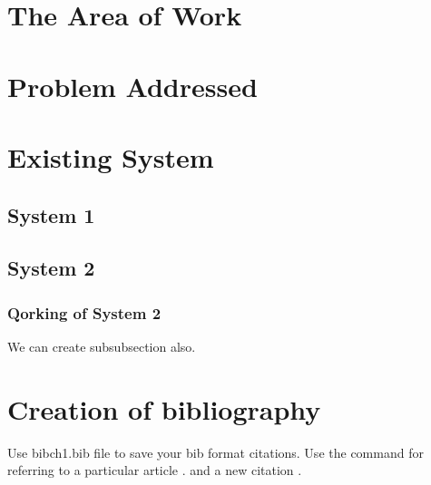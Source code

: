 \section{The Area of Work}
 
\blindtext


\section{Problem Addressed}
\blindtext

\section{Existing System}
\blindtext

\subsection{ System 1}
\blindtext

 \subsection{System 2}
 \subsubsection{Qorking of System 2}
 We can create subsubsection also. 
\section{Creation of bibliography}
Use bibch1.bib file to save your bib format citations. Use the command \cite{saini2010alternative} for referring to a particular article \cite{imre2006majority}. 
and a new citation \cite{chen2023pareto}. 





